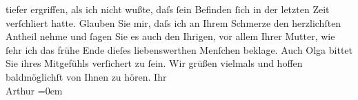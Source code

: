 \begin{ledgroupsized}[t]{13cm}
               tiefer ergriffen, als ich nicht wußte, daſs ſein Befinden ſich in der letzten Zeit
                  verſchli{\geminationm}ert hatte. Glauben Sie mir, daſs ich an
               Ihrem Schmerze den herzlichſten Antheil nehme und ſagen Sie es auch den Ihrigen, vor
               allem Ihrer Mutter, wie
               ſehr ich das {\pb}frühe Ende dieſes
               liebenswerthen Menſchen beklage. Auch Olga
               bittet Sie ihres Mitgefühls verſichert zu ſein. Wir grüßen vielmals und hoffen
               baldmöglichſt von Ihnen zu hören. \pend
           \pstart
           Ihr {\\[\baselineskip]}\spacefill\mbox{Arthur}\pend
           \leftskip=0em{}
         
         \endnumbering{}\end{ledgroupsized}\begin{anhang}\end{anhang}\newcommand{\dateiname}{L03014}\newcommand{\titel}{Arthur Schnitzler an Felix Salten, 29. 6. 1908}\newcommand{\editorInnen}{Martin Anton Müller und Laura Untner}
      
